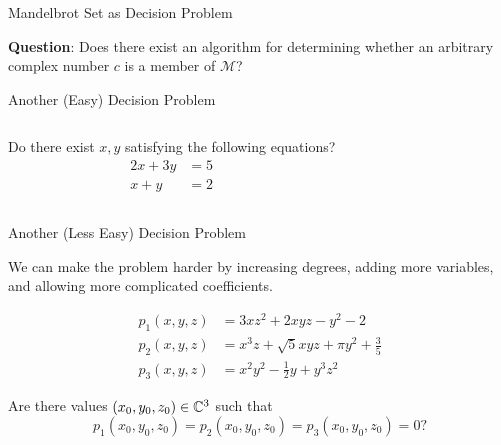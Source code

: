 \documentclass[c]{beamer}
\begin{document}
\begin{frame}{Mandelbrot Set as Decision Problem}
  
  \textbf{Question}: Does there exist an algorithm for determining
  whether an arbitrary complex number $c$ is a member of
  $\mathcal{M}$?
  
\end{frame}

\begin{frame}{Another (Easy) Decision Problem}
  
  \begin{columns}
    
    Do there exist $x, y$ satisfying the following equations?
    \begin{align*}
      2x + 3y &= 5\\
      x + y &= 2
    \end{align*}


    \begin{center}
    \end{center}
  \end{columns}
\end{frame}

\begin{frame}{Another (Less Easy) Decision Problem}
 
  We can make the problem harder by increasing degrees, adding more
  variables, and allowing more complicated coefficients.
  
  \vspace{-\baselineskip}

  \begin{align*}
    p_1(x, y, z) &= 3xz^2 + 2xyz - y^2 - 2\\
    p_2(x, y, z) &= x^3z + \sqrt{5}xyz + \pi y^2 + \frac{3}{5}\\
    p_3(x, y, z) &= x^2y^2 - \frac{1}{2}y + y^3z^2
  \end{align*}\pause
  
  Are there values $(x_0, y_0, z_0) \in \mathbb{C}^3$ such that
  $$p_1(x_0, y_0, z_0) = p_2(x_0, y_0, z_0) = p_3(x_0, y_0, z_0) = 0?$$
  
\end{frame}
\end{document}
